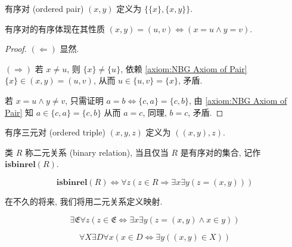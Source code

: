 \begin{definition}[有序对]
    \label {definition:Kuratowski ordered pair}
    有序对 (ordered pair) \((x,y)\) 定义为 \(\{\{x\},\{x,y\}\}\).
\end{definition}

\begin{lemma}
    有序对的有序体现在其性质 \((x,y) = (u,v) \Leftrightarrow (x = u \land y = v)\).

    \begin{proof}
        \((\Leftarrow)\) 显然.

        \((\Rightarrow)\) 若 \(x \neq u\), 则 \(\{x\} \neq \{u\}\), 依赖 \ref{axiom:NBG Axiom of Pair}
        \(\{x\} \in (x,y) = (u,v)\), 从而 \(u \in \{u, v\} = \{x\}\), 矛盾.

        若 \(x = u \land y \neq v\), 只需证明 \(a = b \Leftrightarrow \{c,a\} = \{c,b\}\), 
        由 \ref{axiom:NBG Axiom of Pair} 知 \(a \in \{c,a\} = \{c,b\}\) 从而 \(a = c\), 同理, 
        \(b = c\), 矛盾.
    \end{proof}
\end{lemma}

\begin{definition}[有序三元对]
    \label {definition:ordered triple}
    有序三元对 (ordered triple) \((x,y,z)\) 定义为 \(((x,y),z)\).
\end{definition}

\begin{definition}[二元关系]
    \label {definition:binary relation}
    类 \(R\) 称二元关系 (binary relation), 当且仅当 \(R\) 是有序对的集合, 记作 \(\mathbf{isbinrel} (R)\).

    \[
        \mathbf{isbinrel} (R) \Leftrightarrow \forall z (z \in R \Rightarrow \exists x \exists y (z = (x,y)))
    \]
\end{definition}

在不久的将来, 我们将用二元关系定义映射.

\begin{axiom}
    \label {axiom:NBG Axiom of Membership}
    \[
        \exists \mathfrak{E} \forall z (z \in \mathfrak{E} \Leftrightarrow \exists x \exists y (z = (x,y) \land x \in y))
    \]
\end{axiom}

\begin{axiom}
    \label {axiom:NBG Axiom of Domain}
    \[
        \forall X \exists D \forall x (x \in D \Leftrightarrow \exists y ((x,y) \in X))
    \]
\end{axiom}

